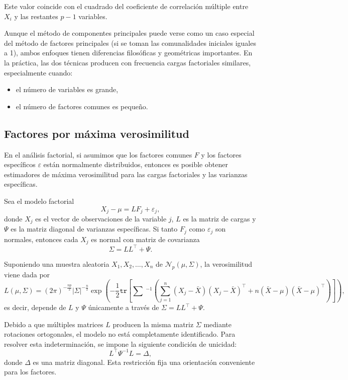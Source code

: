 \documentclass[
]{book}
\begin{document}
Este valor coincide con el cuadrado del coeficiente de correlación múltiple entre
\(X_i\) y las restantes \(p-1\) variables.

Aunque el método de componentes principales puede verse como un caso especial del
método de factores principales (si se toman las comunalidades iniciales iguales a
1), ambos enfoques tienen diferencias filosóficas y geométricas importantes. En la
práctica, las dos técnicas producen con frecuencia cargas factoriales similares,
especialmente cuando:

\begin{itemize}
\item
  el número de variables es grande,
\item
  el número de factores comunes es pequeño.
\end{itemize}

\subsection{Factores por máxima verosimilitud}\label{factores-por-muxe1xima-verosimilitud}

En el análisis factorial, si asumimos que los factores comunes \(F\) y los factores
específicos \(\varepsilon\) están normalmente distribuidos, entonces es posible
obtener estimadores de máxima verosimilitud para las cargas factoriales y las
varianzas específicas.

Sea el modelo factorial
\[
X_j - \mu = L F_j + \varepsilon_j,
\]
donde \(X_j\) es el vector de observaciones de la variable \(j\), \(L\) es la matriz de
cargas y \(\Psi\) es la matriz diagonal de varianzas específicas. Si tanto
\(F_j\) como \(\varepsilon_j\) son normales, entonces cada \(X_j\) es normal con matriz
de covarianza
\[
\Sigma = LL^{\top} + \Psi.
\]

Suponiendo una muestra aleatoria \(X_1, X_2, \ldots, X_n\) de
\(\mathcal{N}_p(\mu, \Sigma)\), la verosimilitud viene dada por
\[
L(\mu,\Sigma)
= (2\pi)^{-\frac{np}{2}} |\Sigma|^{-\frac{n}{2}}
\exp\left(
    -\frac{1}{2}\texttt{tr}\left[\sum \ ^{-1} \left(\sum_{j=1}^{n} (X_j -\bar{X})(X_j -\bar{X})^{\top} +
    n(\bar{X} - \mu)(\bar{X} - \mu)^{\top} \right)\right]
\right),
\]
es decir, depende de \(L\) y \(\Psi\) únicamente a través de \(\Sigma = LL^{\top} + \Psi\).

Debido a que múltiples matrices \(L\) producen la misma matriz \(\Sigma\) mediante
rotaciones ortogonales, el modelo no está completamente identificado. Para
resolver esta indeterminación, se impone la siguiente condición de unicidad:
\[
L^{\top}\Psi^{-1} L = \Delta,
\]
donde \(\Delta\) es una matriz diagonal. Esta restricción fija una
orientación conveniente para los factores.
\end{document}
